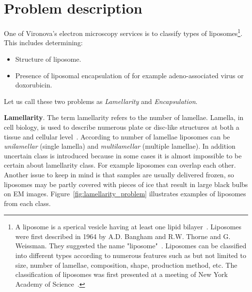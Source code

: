 \documentclass[a4paper, 11pt, table]{article}
\begin{document}
\section{Problem description}
\label{sec:problem_description}
One of Vironova's electron microscopy services is to classify types of liposomes\footnote{A liposome is a sperical vesicle having at least one lipid bilayer~\cite{betageri1993liposome}. Liposomes were first described in 1964 by A.D. Bangham and R.W. Thorne and G. Weissman. They suggested the name "liposome"~\cite{betageri1993liposome}. Liposomes can be classified into different types according to numerous features such as but not limited to size, number of lamellae, composition, shape, production method, etc. The classification of liposomes was first presented at a meeting of New York Academy of Science~\cite{liposomes1978}.}. This includes determining:
\begin{itemize}
\item Structure of liposome.
\item Presence of liposomal encapsulation of for example adeno-associated virus or doxorubicin.
\end{itemize}

Let us call these two problems as \textit{Lamellarity} and \textit{Encapsulation}.\medskip

\textbf{Lamellarity}. The term lamellarity refers to the number of lamellae. Lamella, in cell biology, is used to describe numerous plate or disc-like structures at both a tissue and cellular level~\cite{cammack2006oxford}. According to number of lamellae liposomes can be \textit{unilamellar} (single lamella) and \textit{multilamellar} (multiple lamellae). In addition uncertain class is introduced because in some cases it is almost impossible to be certain about lamellarity class. For example liposomes can overlap each other. Another issue to keep in mind is that samples are usually delivered frozen, so liposomes may be partly covered with pieces of ice that result in large black bulbs on EM images. Figure~\ref{fig:lamellarity_problem} illustrates examples of liposomes from each class.
\end{document}
